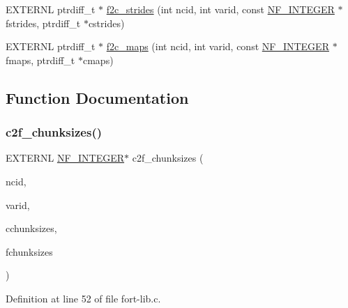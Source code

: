 \begin{DoxyCompactItemize}
\item 
E\+X\+T\+E\+R\+NL ptrdiff\+\_\+t $\ast$ \hyperlink{fort-lib_8h_acdc8897d97daefc13edaadd990b8a566}{f2c\+\_\+strides} (int ncid, int varid, const \hyperlink{ncfortran_8h_a0fd3f9e9fc30661142a1fb549af678e7}{N\+F\+\_\+\+I\+N\+T\+E\+G\+ER} $\ast$fstrides, ptrdiff\+\_\+t $\ast$cstrides)
\item 
E\+X\+T\+E\+R\+NL ptrdiff\+\_\+t $\ast$ \hyperlink{fort-lib_8h_a67f01ea998846113dc84243e0f0e1201}{f2c\+\_\+maps} (int ncid, int varid, const \hyperlink{ncfortran_8h_a0fd3f9e9fc30661142a1fb549af678e7}{N\+F\+\_\+\+I\+N\+T\+E\+G\+ER} $\ast$fmaps, ptrdiff\+\_\+t $\ast$cmaps)
\end{DoxyCompactItemize}


\subsection{Function Documentation}
\mbox{\label{fort-lib_8h_a706533cd60fe8cc16c7268db18e64aa2}} 
\subsubsection{\texorpdfstring{c2f\+\_\+chunksizes()}{c2f\_chunksizes()}}
{\footnotesize\ttfamily E\+X\+T\+E\+R\+NL \hyperlink{ncfortran_8h_a0fd3f9e9fc30661142a1fb549af678e7}{N\+F\+\_\+\+I\+N\+T\+E\+G\+ER}$\ast$ c2f\+\_\+chunksizes (\begin{DoxyParamCaption}\item[{int}]{ncid,  }\item[{int}]{varid,  }\item[{const int $\ast$}]{cchunksizes,  }\item[{\hyperlink{ncfortran_8h_a0fd3f9e9fc30661142a1fb549af678e7}{N\+F\+\_\+\+I\+N\+T\+E\+G\+ER} $\ast$}]{fchunksizes }\end{DoxyParamCaption})}



Definition at line 52 of file fort-\/lib.\+c.

\mbox{\label{fort-lib_8h_a7ad9c588c0601d0aac54053a2dfc5fb1}} 

